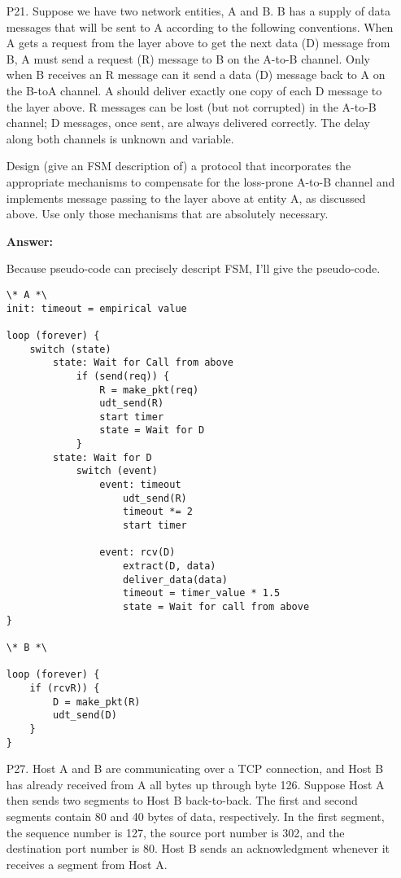 \begin{enumerate}
    \item[P21.] Suppose we have two network entities, A and B. B has a supply of data messages that will be sent to A according to the following conventions. When A gets a request from the layer above to get the next data (D) message from B, A must send a request (R) message to B on the A-to-B channel. Only when B receives an R message can it send a data (D) message back to A on the B-toA channel. A should deliver exactly one copy of each D message to the layer above. R messages can be lost (but not corrupted) in the A-to-B channel; D messages, once sent, are always delivered correctly. The delay along both channels is unknown and variable.
    
    Design (give an FSM description of) a protocol that incorporates the appropriate mechanisms to compensate for the loss-prone A-to-B channel and implements message passing to the layer above at entity A, as discussed above. Use only those mechanisms that are absolutely necessary.
    
    \textbf{Answer: }

    Because pseudo-code can precisely descript FSM, I'll give the pseudo-code. 

    \begin{lstlisting}
\* A *\
init: timeout = empirical value

loop (forever) {
    switch (state)
        state: Wait for Call from above
            if (send(req)) {
                R = make_pkt(req)
                udt_send(R)
                start timer
                state = Wait for D
            }
        state: Wait for D
            switch (event)
                event: timeout
                    udt_send(R)
                    timeout *= 2
                    start timer

                event: rcv(D)
                    extract(D, data)
                    deliver_data(data)
                    timeout = timer_value * 1.5
                    state = Wait for call from above
}

\* B *\

loop (forever) {
    if (rcvR)) {
        D = make_pkt(R)
        udt_send(D)
    }
}
    \end{lstlisting}

    \item[P27.] Host A and B are communicating over a TCP connection, and Host B has already received from A all bytes up through byte 126. Suppose Host A then sends two segments to Host B back-to-back. The first and second segments contain 80 and 40 bytes of data, respectively. In the first segment, the sequence number is 127, the source port number is 302, and the destination port number is 80. Host B sends an acknowledgment whenever it receives a segment from Host A.
    \begin{enumerate}
        

\end{enumerate}
\end{enumerate}

